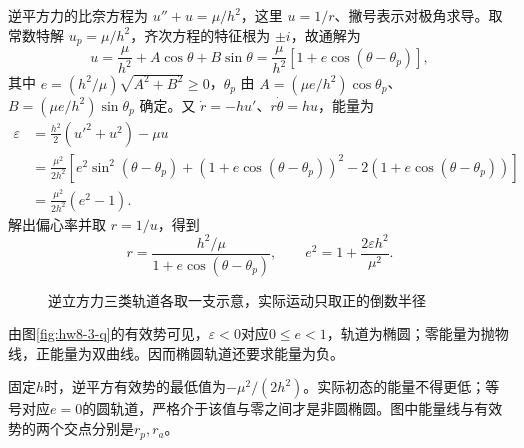 \begin{solution}
逆平方力的比奈方程为 $u''+u=\mu/h^2$，这里 $u=1/r$、撇号表示对极角求导。取常数特解 $u_p=\mu/h^2$，齐次方程的特征根为 $\pm i$，故通解为
\[
u=\frac\mu{h^2}+A\cos\theta+B\sin\theta
=\frac\mu{h^2}[1+e\cos(\theta-\theta_p)],
\]
其中 $e=(h^2/\mu)\sqrt{A^2+B^2}\ge0$，$\theta_p$ 由 $A=(\mu e/h^2)\cos\theta_p$、$B=(\mu e/h^2)\sin\theta_p$ 确定。又 $\dot r=-hu'$、$r\dot\theta=hu$，能量为
\[
\begin{aligned}
\varepsilon&=\frac{h^2}{2}(u'^2+u^2)-\mu u\\
&=\frac{\mu^2}{2h^2}\left[e^2\sin^2(\theta-\theta_p)
+(1+e\cos(\theta-\theta_p))^2-2(1+e\cos(\theta-\theta_p))\right]\\
&=\frac{\mu^2}{2h^2}(e^2-1).
\end{aligned}
\]
解出偏心率并取 $r=1/u$，得到
\[
 \boxed{r=\frac{h^2/\mu}{1+e\cos(\theta-\theta_p)},\qquad
 e^2=1+\frac{2\varepsilon h^2}{\mu^2}}.
\]

\begin{figure}[H]\centering
{}
\caption{逆立方力三类轨道各取一支示意，实际运动只取正的倒数半径}\label{fig:hw8-3-s}
\end{figure}

由图\ref{fig:hw8-3-q}的有效势可见，$\varepsilon<0$对应$0\le e<1$，轨道为椭圆；零能量为抛物线，正能量为双曲线。因而椭圆轨道还要求能量为负。

固定$h$时，逆平方有效势的最低值为$-\mu^2/(2h^2)$。实际初态的能量不得更低；等号对应$e=0$的圆轨道，严格介于该值与零之间才是非圆椭圆。图中能量线与有效势的两个交点分别是$r_p,r_a$。


\end{solution}
